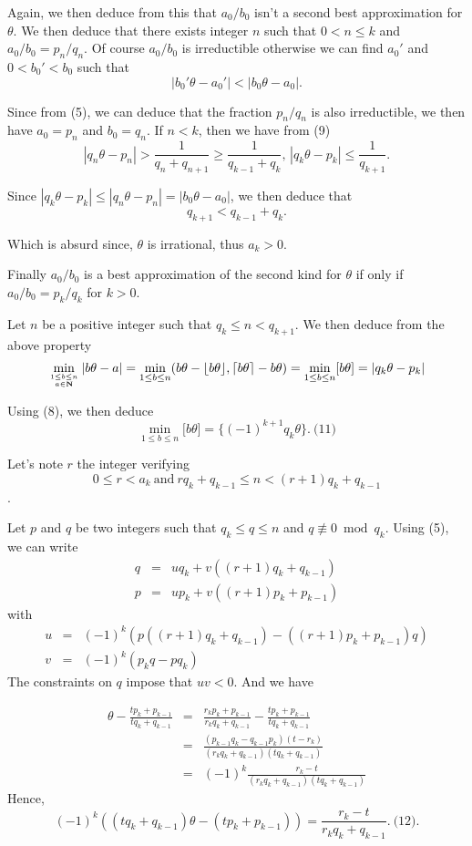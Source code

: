 \documentclass[a4paper,12pt]{article}
\begin{document}
Again, we then deduce from this that $a_0/b_0$ isn't a second best
approximation for $\theta$.  We then deduce that there exists integer
$n$ such that $0<n\le k$ and $a_0/b_0 = p_n/q_n$.  Of course $a_0/b_0$
is irreductible otherwise we can find $a_0'$ and $0 < b_0'< b_0$ such
that
\[ |b_0'\theta - a_0'| < |b_0 \theta - a_0|.\]

Since from (5), we can deduce that the fraction $p_n/q_n$ is also
irreductible, we then have $a_0 = p_n$ and $b_0 = q_n$.  If $n < k$,
then we have from (9)
\[ |q_n\theta - p_n| > \frac{1}{q_n+q_{n+1}} \ge
\frac{1}{q_{k-1}+q_k},\,|q_k \theta - p_k| \le \frac{1}{q_{k+1}}. \]

Since $|q_k\theta - p_k| \le |q_n\theta - p_n| = |b_0\theta - a_0|$,
we then deduce that
\[ q_{k+1} < q_{k-1} + q_k.\]

Which is absurd since, $\theta$ is irrational, thus $a_k > 0$.

Finally $a_0/b_0$ is a best approximation of the second kind for
$\theta$ if only if $a_0/b_0 = p_k/q_k$ for $k>0$.

Let $n$ be a positive integer such that $q_k\le n < q_{k+1}$.  We then
deduce from the above property
\begin{eqnarray*}
  \min_{1\le b\le n\atop a\in\mathbf{N}}|b\theta - a| = \min_{1\le
    b\le n}(b\theta - \lfloor b\theta\rfloor, \lceil b\theta\rceil -
  b\theta) = \min_{1\le b\le n}\lbrack b\theta\rbrack = |q_k\theta - p_k|
\end{eqnarray*}

Using (8), we then deduce
\[ \min_{1\le b\le n}\lbrack b\theta\rbrack =
\{(-1)^{k+1}q_k\theta\}.\ \mbox{(11)}\]

Let's note $r$ the integer verifying
\[0\le r< a_k\ \mbox{and}\ rq_k + q_{k-1} \le n < (r+1)q_k +
q_{k-1}\].

Let $p$ and $q$ be two integers such that $q_k \le q \le n$ and $q
\not\equiv 0 \bmod{q_k}$.  Using (5), we can write
\begin{eqnarray*}
  q &=& u q_k + v ((r+1)q_k + q_{k-1}) \\
  p &=& u p_k + v ((r+1)p_k + p_{k-1})
\end{eqnarray*}
with
\begin{eqnarray*}
  u &=& (-1)^k ( p ((r+1)q_k + q_{k-1}) - ((r+1) p_k + p_{k-1}) q) \\
  v &=& (-1)^k ( p_k q - p q_k)
\end{eqnarray*}
The constraints on $q$ impose that $uv < 0$.  And we have

\begin{eqnarray*}
  \theta - \frac{t p_k + p_{k-1}}{tq_k + q_{k-1}} &=&
  \frac{r_k p_k + p_{k-1}}{r_k q_k + q_{k-1}} - \frac{tp_k +
    p_{k-1}}{tq_k + q_{k-1}} \\
  &=&\frac{(p_{k-1}q_k - q_{k-1}p_k)(t - r_k)}{(r_k q_k +
    q_{k-1})(tq_k+q_{k-1})} \\
  &=& (-1)^k \frac{r_k - t}{(r_k q_k + q_{k-1})(t q_k + q_{k-1})}
\end{eqnarray*}
Hence,
\[ (-1)^k((tq_k + q_{k-1})\theta - (tp_k + p_{k-1})) = \frac{r_k -
  t}{r_kq_k + q_{k-1}}.\ \mbox{(12)}.\]
\end{document}
